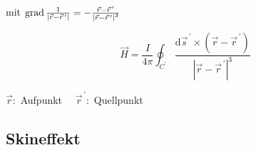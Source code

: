 mit $\operatorname{grad} \frac{1}{\left|\vec{r}-\vec{r}^{\,\prime}\right|}=-\frac{\vec{r}-\vec{r}^{\,\prime}}{\left|\vec{r}-\vec{r}^{\,\prime}\right|^{3}}$

\[
    \vec{H}=\frac{I}{4 \pi} \oint_{C^{\prime}} \frac{\mathrm{d} \vec{s}^{\,\prime} \times\left(\vec{r}-\vec{r}^{\,\prime}\right)}{\left|\vec{r}-\vec{r}^{\,\prime}\right|^{3}}
\]

$\vec{r}:$ Aufpunkt $\quad \vec{r}^{\,\prime}:$ Quellpunkt


\subsection{Skineffekt}


